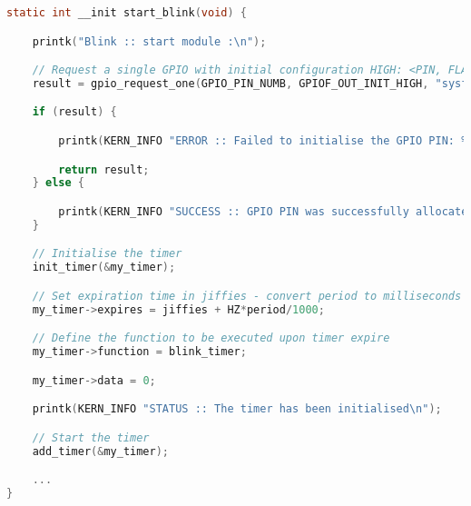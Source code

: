 \documentclass[a4paper,oneside,onecolumn]{article}
\begin{document}
\begin{lstlisting}[language=c, label={lst:initial_blink}, caption={Initial Configuration of LED}]
static int __init start_blink(void) {

    printk("Blink :: start module :\n");

    // Request a single GPIO with initial configuration HIGH: <PIN, FLAGS, label>
    result = gpio_request_one(GPIO_PIN_NUMB, GPIOF_OUT_INIT_HIGH, "sysfs");

    if (result) {

        printk(KERN_INFO "ERROR :: Failed to initialise the GPIO PIN: %d\n", GPIO_PIN_NUMB);

        return result;
    } else {

        printk(KERN_INFO "SUCCESS :: GPIO PIN was successfully allocated\n");
    }

    // Initialise the timer
    init_timer(&my_timer);

    // Set expiration time in jiffies - convert period to milliseconds
    my_timer->expires = jiffies + HZ*period/1000;

    // Define the function to be executed upon timer expire
    my_timer->function = blink_timer;

    my_timer->data = 0;

    printk(KERN_INFO "STATUS :: The timer has been initialised\n");

    // Start the timer
    add_timer(&my_timer);

    ...
}
\end{lstlisting}
\end{document}
